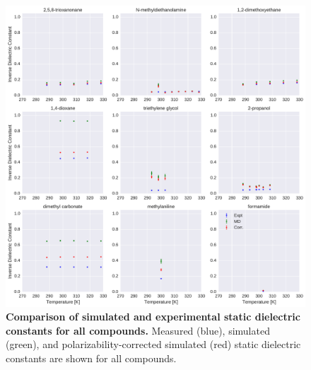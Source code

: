 \documentclass[journal=jacsat,manuscript=article]{achemso}
\begin{document}
\begin{figure}[alldielectric]

\ContinuedFloat

\includegraphics[width=\textwidth]{./figures/dielectric_versus_temperature_part3.pdf}

\caption{{\bf Comparison of simulated and experimental static dielectric constants for all compounds.}
Measured (blue), simulated (green), and polarizability-corrected simulated (red) static dielectric constants are shown for all compounds.
}

\label{figure:AllDielectrics}

\end{figure}
\end{document}
